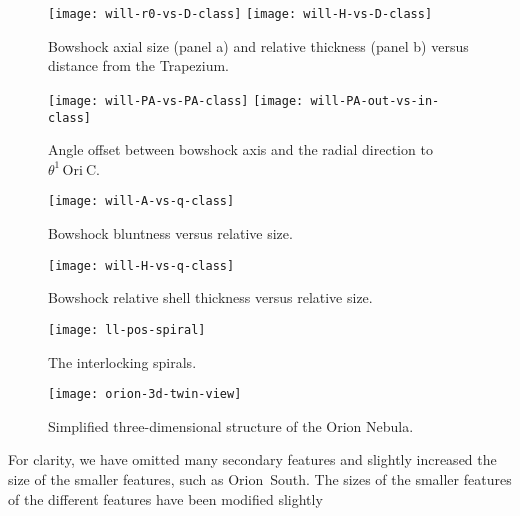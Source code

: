 \documentclass[apj, twocolumn]{aastex63}
\newcommand\thC{\ensuremath{\theta^1\,\mathrm{Ori~C}}}
\begin{document}
\begin{figure}
  \centering
  \texttt{[image: will-r0-vs-D-class]}
  \texttt{[image: will-H-vs-D-class]}
  \caption{Bowshock axial size (panel a) and relative thickness (panel b) versus distance from the Trapezium.}
  \label{fig:size-v-distance}
\end{figure}
\begin{figure}
  \centering
  \texttt{[image: will-PA-vs-PA-class]}
  \texttt{[image: will-PA-out-vs-in-class]}
  \caption{Angle offset between bowshock axis and the radial direction to \thC{}.}
  \label{fig:PA-v-PA}
\end{figure}
\begin{figure}
  \centering
  \texttt{[image: will-A-vs-q-class]}
  \caption{Bowshock bluntness versus relative size.}
  \label{fig:A-v-q}
\end{figure}
\begin{figure}
  \centering
  \texttt{[image: will-H-vs-q-class]}
  \caption{Bowshock relative shell thickness versus relative size.}
  \label{fig:H-v-q}
\end{figure}

\begin{figure}
  \centering
  \texttt{[image: ll-pos-spiral]}
  \caption{The interlocking spirals.}
  \label{fig:spiral-bars}
\end{figure}

\begin{figure*}
  \centering
  \texttt{[image: orion-3d-twin-view]}
  \caption{Simplified three-dimensional structure of the Orion Nebula.}
  \label{fig:3d-twin}
\end{figure*}

For clarity, we have omitted many secondary features and slightly
increased the size of the smaller features, such as Orion~South. 
The sizes of the smaller features  of the different features have been
modified slightly


\end{document}
